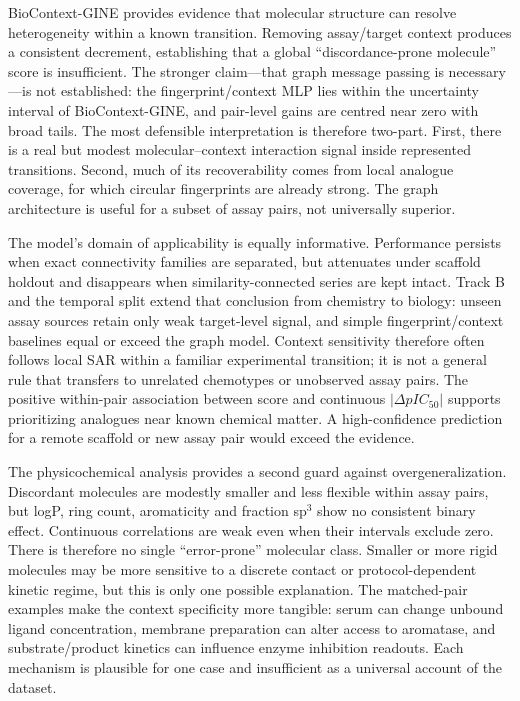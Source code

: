 \documentclass[letterpaper]{article}
\begin{document}
BioContext-GINE provides evidence that molecular structure can resolve heterogeneity within a known transition. Removing assay/target context produces a consistent decrement, establishing that a global ``discordance-prone molecule'' score is insufficient. The stronger claim---that graph message passing is necessary---is not established: the fingerprint/context MLP lies within the uncertainty interval of BioContext-GINE, and pair-level gains are centred near zero with broad tails. The most defensible interpretation is therefore two-part. First, there is a real but modest molecular--context interaction signal inside represented transitions. Second, much of its recoverability comes from local analogue coverage, for which circular fingerprints are already strong. The graph architecture is useful for a subset of assay pairs, not universally superior.

The model's domain of applicability is equally informative. Performance persists when exact connectivity families are separated, but attenuates under scaffold holdout and disappears when similarity-connected series are kept intact. Track B and the temporal split extend that conclusion from chemistry to biology: unseen assay sources retain only weak target-level signal, and simple fingerprint/context baselines equal or exceed the graph model. Context sensitivity therefore often follows local SAR within a familiar experimental transition; it is not a general rule that transfers to unrelated chemotypes or unobserved assay pairs. The positive within-pair association between score and continuous $|\Delta pIC_{50}|$ supports prioritizing analogues near known chemical matter. A high-confidence prediction for a remote scaffold or new assay pair would exceed the evidence.

The physicochemical analysis provides a second guard against overgeneralization. Discordant molecules are modestly smaller and less flexible within assay pairs, but logP, ring count, aromaticity and fraction sp$^3$ show no consistent binary effect. Continuous correlations are weak even when their intervals exclude zero. There is therefore no single ``error-prone'' molecular class. Smaller or more rigid molecules may be more sensitive to a discrete contact or protocol-dependent kinetic regime, but this is only one possible explanation. The matched-pair examples make the context specificity more tangible: serum can change unbound ligand concentration, membrane preparation can alter access to aromatase, and substrate/product kinetics can influence enzyme inhibition readouts. Each mechanism is plausible for one case and insufficient as a universal account of the dataset.
\end{document}
